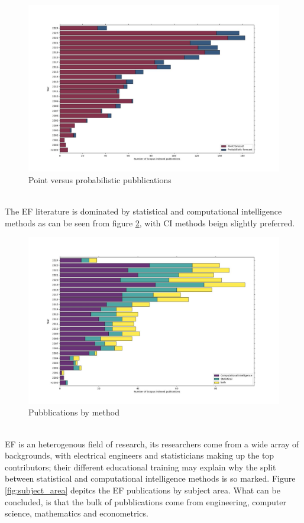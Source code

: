 \begin{figure}
  \includegraphics[width=\textwidth]{images/point_vs_prob.jpg}
  \caption{Point versus probabilistic pubblications}
  \label{fig:point_vs_prob}
\end{figure}
\\
The EF literature is dominated by statistical and computational intelligence methods as can be seen from figure \ref{fig:cs_stat_both}, with CI methods beign slightly preferred. 
\begin{figure}
  \includegraphics[width=\textwidth]{images/cs_stat_both.jpg}
  \caption{Pubblications by method}
  \label{fig:cs_stat_both}
\end{figure}
\\
EF is an heterogenous field of research, its researchers come from a wide array of backgrounds, with electrical engineers and statisticians making up the top contributors; their different educational training may explain why the split between statistical and computational intelligence methods is so marked. Figure \ref{fig:subject_area} depitcs the EF publications by subject area. What can be concluded, is that the bulk of pubblications come from engineering, computer science, mathematics and econometrics.
